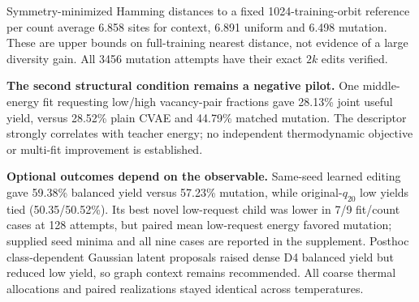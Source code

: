 Symmetry-minimized Hamming distances to a fixed 1024-training-orbit reference per
count average 6.858 sites for context, 6.891 uniform and 6.498 mutation.
These are upper bounds on full-training nearest distance, not evidence of a large
diversity gain. All 3456 mutation attempts have their exact $2k$ edits verified.

\textbf{The second structural condition remains a negative pilot.}
One middle-energy fit requesting low/high vacancy-pair fractions gave 28.13\%
joint useful yield, versus 28.52\% plain CVAE and 44.79\% matched mutation.
The descriptor strongly correlates with teacher energy; no independent
thermodynamic objective or multi-fit improvement is established.

\textbf{Optional outcomes depend on the observable.} Same-seed learned editing
gave 59.38\% balanced yield versus 57.23\% mutation, while original-$q_{20}$ low
yields tied (50.35/50.52\%). Its best novel low-request child was lower in 7/9
fit/count cases at 128 attempts, but paired mean low-request energy favored
mutation; supplied seed minima and all nine cases are reported in the supplement.
Posthoc class-dependent Gaussian latent proposals raised dense D4 balanced yield
but reduced low yield, so graph context remains recommended. All coarse thermal
allocations and paired realizations stayed identical across temperatures.

